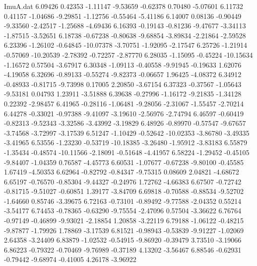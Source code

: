 \begin{filecontents}{ImuA.dat}
   6.09426    0.42353   -1.11147   -9.53659   -0.62378    0.70480   -5.07601
   6.11732    0.41157   -1.04686   -9.29851   -1.12756   -0.55464   -5.41186
   6.14007    0.08136   -0.90449   -9.33560   -2.42517   -1.25688   -4.69436
   6.16393   -0.19143   -0.81236   -9.47677   -3.34113   -1.87515   -3.52651
   6.18738   -0.67238   -0.80638   -9.68854   -3.89834   -2.21864   -2.59528
   6.23396   -1.26102   -0.64845  -10.07378   -3.70751   -1.92095   -2.17547
   6.25726   -1.21914   -0.57069  -10.20539   -2.78392   -0.72257   -2.87770
   6.28035   -1.15095   -0.45224  -10.15634   -1.16572    0.57504   -3.67917
   6.30348   -1.09113   -0.40558   -9.91945   -0.19633    1.62076   -4.19058
   6.32696   -0.89133   -0.55274   -9.82373   -0.06657    1.96425   -4.08372
   6.34912   -0.48933   -0.81715   -9.73998    0.17005    2.20850   -3.67154
   6.37323   -0.37567   -1.05643   -9.53181    0.04793    1.23911   -3.51888
   6.39638   -0.27996   -1.16172   -9.21835   -1.34128    0.22392   -2.98457
   6.41965   -0.28116   -1.06481   -9.28056   -2.31067   -1.55457   -2.70214
   6.44278   -0.33021   -0.97388   -9.41097   -3.19610   -2.56976   -2.74794
   6.46597   -0.60419   -0.82313   -9.52343   -3.32586   -3.43992   -3.19829
   6.48926   -0.89970   -0.57547   -9.67657   -3.74568   -3.72997   -3.17539
   6.51247   -1.10429   -0.52642  -10.02353   -3.86780   -3.49335   -3.41965
   6.53556   -1.23230   -0.53719  -10.18385   -3.26480   -1.95912   -3.83183
   6.55879   -1.35434   -0.48574  -10.11566   -2.18091   -0.51648   -4.41957
   6.58224   -1.29452   -0.45105   -9.84407   -1.04359    0.76587   -4.45773
   6.60531   -1.07677   -0.67238   -9.80100   -0.45585    1.67419   -4.50353
   6.62964   -0.82792   -0.84347   -9.75315    0.08609    2.04821   -4.68672
   6.65197   -0.76570   -0.85304   -9.44327   -0.24976    1.72762   -4.66383
   6.67507   -0.72742   -0.81715   -9.51027   -0.60851    1.39177   -3.84709
   6.69818   -0.70588   -0.88534   -9.52702   -1.64660    0.85746   -3.39675
   6.72163   -0.73101   -0.89492   -9.77588   -2.04352    0.55214   -3.54177
   6.74453   -0.78365   -0.63290   -9.75554   -2.47096    0.57504   -3.36622
   6.76764   -0.97149   -0.46899   -9.93021   -2.18854    1.20858   -3.22119
   6.79188   -1.06122   -0.48215   -9.87877   -1.79926    1.78869   -3.17539
   6.81521   -0.98943   -0.53839   -9.91227   -1.02069    2.64358   -3.24409
   6.83879   -1.02532   -0.54915   -9.86920   -0.39479    3.73510   -3.19066
   6.86223   -0.79322   -0.70469   -9.76989   -0.37189    4.13202   -3.56467
   6.88546   -0.62931   -0.79442   -9.68974   -0.41005    4.26178   -3.96922

\end{filecontents}
